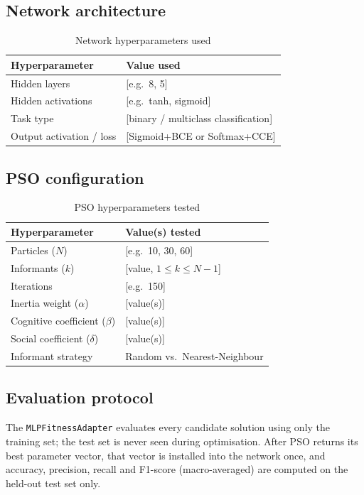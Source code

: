 \documentclass[conference]{IEEEtran}
\begin{document}
\subsection{Network architecture}
\begin{table}[h]
\caption{Network hyperparameters used}
\label{tab:network}
\centering
\begin{tabular}{ll}
\toprule
\textbf{Hyperparameter} & \textbf{Value used} \\
\midrule
Hidden layers & [e.g.\ 8, 5] \\
Hidden activations & [e.g.\ tanh, sigmoid] \\
Task type & [binary / multiclass classification] \\
Output activation / loss & [Sigmoid+BCE or Softmax+CCE] \\
\bottomrule
\end{tabular}
\end{table}

\subsection{PSO configuration}
\begin{table}[h]
\caption{PSO hyperparameters tested}
\label{tab:pso}
\centering
\begin{tabular}{ll}
\toprule
\textbf{Hyperparameter} & \textbf{Value(s) tested} \\
\midrule
Particles ($N$) & [e.g.\ 10, 30, 60] \\
Informants ($k$) & [value, $1 \le k \le N-1$] \\
Iterations & [e.g.\ 150] \\
Inertia weight ($\alpha$) & [value(s)] \\
Cognitive coefficient ($\beta$) & [value(s)] \\
Social coefficient ($\delta$) & [value(s)] \\
Informant strategy & Random vs.\ Nearest-Neighbour \\
\bottomrule
\end{tabular}
\end{table}

\subsection{Evaluation protocol}
The \texttt{MLPFitnessAdapter} evaluates every candidate solution using
only the training set; the test set is never seen during optimisation.
After PSO returns its best parameter vector, that vector is installed into
the network once, and accuracy, precision, recall and F1-score
(macro-averaged) are computed on the held-out test set only.
\end{document}

